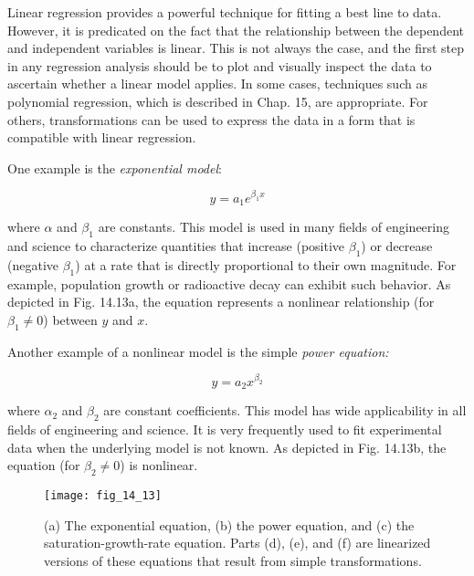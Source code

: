 \documentclass[../main.tex]{subfiles}
\begin{document}
Linear regression provides a powerful technique for fitting a best line to data. However, it is predicated on the fact that the relationship between the dependent and independent variables is linear. This is not always the case, and the first step in any regression analysis should be to plot and visually inspect the data to ascertain whether a linear model applies. In some cases, techniques such as polynomial regression, which is described in Chap. 15, are appropriate. For others, transformations can be used to express the data in a form that is compatible with linear regression.

One example is the \textit{exponential model}:

\begin{equation}
	\tag{14.22}
	y = a_1 e^{\beta_1 x}
\end{equation}

\noindent where $\alpha$ and $\beta_1$ are constants. This model is used in many fields of engineering and science to characterize quantities that increase (positive $\beta_1$) or decrease (negative $\beta_1$) at a rate that is directly proportional to their own magnitude. For example, population growth or radioactive decay can exhibit such behavior. As depicted in Fig. 14.13a, the equation represents a nonlinear relationship (for $\beta_1 \neq 0$) between $y$ and $x$.

Another example of a nonlinear model is the simple \textit{power equation:}

\begin{equation}
\tag{14.23}
y = a_2 x^{\beta_2}
\end{equation}

\noindent where $\alpha_2$ and $\beta_2$ are constant coefficients. This model has wide applicability in all fields of engineering and science. It is very frequently used to fit experimental data when the underlying model is not known. As depicted in Fig. 14.13b, the equation (for $\beta_2 \neq 0$) is nonlinear.

\begin{figure}[H]
	\centering
	\texttt{[image: fig\_14\_13]}
	\caption{\textsf{(a) The exponential equation, (b) the power equation, and (c) the saturation-growth-rate equation. Parts (d), (e), and (f) are linearized versions of these equations that result from simple transformations.}}
	\label{fig:fig_14_13}
	\label{fig:fig_14_13a}
	\label{fig:fig_14_13b}
	\label{fig:fig_14_13c}
	\label{fig:fig_14_13d}
	\label{fig:fig_14_13e}
	\label{fig:fig_14_13f}
\end{figure}
\end{document}
